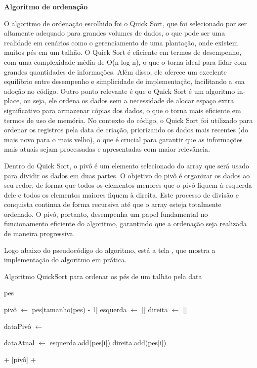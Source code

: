 \textbf{Algoritmo de ordenação}

O algoritmo de ordenação escolhido foi o Quick Sort, que foi selecionado por ser altamente adequado para grandes volumes de dados, o que pode ser uma realidade em cenários como o gerenciamento de uma plantação, onde existem muitos pés em um talhão. O Quick Sort é eficiente em termos de desempenho, com uma complexidade média de O(n log n), o que o torna ideal para lidar com grandes quantidades de informações. Além disso, ele oferece um excelente equilíbrio entre desempenho e simplicidade de implementação, facilitando a sua adoção no código. Outro ponto relevante é que o Quick Sort é um algoritmo in-place, ou seja, ele ordena os dados sem a necessidade de alocar espaço extra significativo para armazenar cópias dos dados, o que o torna mais eficiente em termos de uso de memória. No contexto do código, o Quick Sort foi utilizado para ordenar os registros pela data de criação, priorizando os dados mais recentes (do mais novo para o mais velho), o que é crucial para garantir que as informações mais atuais sejam processadas e apresentadas com maior relevância.

Dentro do Quick Sort, o pivô é um elemento selecionado do array que será usado para dividir os dados em duas partes. O objetivo do pivô é organizar os dados ao seu redor, de forma que todos os elementos menores que o pivô fiquem à esquerda dele e todos os elementos maiores fiquem à direita. Este processo de divisão e conquista continua de forma recursiva até que o array esteja totalmente ordenado. O pivô, portanto, desempenha um papel fundamental no funcionamento eficiente do algoritmo, garantindo que a ordenação seja realizada de maneira progressiva.

Logo abaixo do pseudocódigo do algoritmo, está a tela , que mostra a implementação do algoritmo em prática.

\begin{algorithm}
    \caption{Algoritmo QuickSort para ordenar os pés de um talhão pela data}
    \begin{algorithmic}[1]
            \State \Return pes
        \EndIf
    
        \State pivô $\gets$ pes[tamanho(pes) - 1]
        \State esquerda $\gets$ []
        \State direita $\gets$ []
    
        \State dataPivô $\gets$ 
    
            \State dataAtual $\gets$ 
                \State esquerda.add(pes[i])
            \Else
                \State direita.add(pes[i])
            \EndIf
        \EndFor
    
        \State \Return {} + [pivô] + 
    \EndFunction
    \end{algorithmic}
\end{algorithm}


